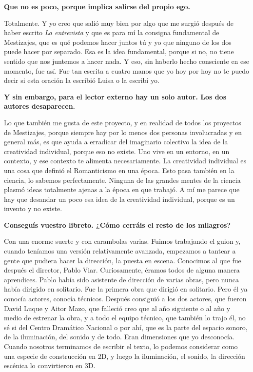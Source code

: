 \documentclass[11pt,a4paper]{article}
\newcommand{\preg}[1]{\textbf{#1}}
\begin{document}
\preg{Que no es poco, porque implica salirse del propio ego.}

Totalmente. Y yo creo que salió muy bien por algo que me surgió después de haber escrito \emph{La entrevista} y que es para mí la consigna fundamental de Mestizajes, que es qué podemos hacer juntos tú y yo que ninguno de los dos puede hacer por separado. Esa es la idea fundamental, porque si no, no tiene sentido que nos juntemos a hacer nada. Y eso, sin haberlo hecho consciente en ese momento, fue así. Fue tan escrita a cuatro manos que yo hoy por hoy no te puedo decir si esta oración la escribió Luisa o la escribí yo.

\preg{Y sin embargo, para el lector externo hay un solo autor. Los dos autores desaparecen.}

Lo que también me gusta de este proyecto, y en realidad de todos los proyectos de Mestizajes, porque siempre hay por lo menos dos personas involucradas y en general más, es que ayuda a erradicar del imaginario colectivo la idea de la creatividad individual, porque eso no existe. Uno vive en un entorno, en un contexto, y ese contexto te alimenta necesariamente. La creatividad individual es una cosa que definió el Romanticismo en una época. Esto pasa también en la ciencia, lo sabemos perfectamente. Ninguna de las grandes mentes de la ciencia plasmó ideas totalmente ajenas a la época en que trabajó. A mí me parece que hay que desandar un poco esa idea de la creatividad individual, porque es un invento y no existe.

\preg{Conseguís vuestro libreto. ¿Cómo cerráis el resto de los milagros?}

Con una enorme suerte y con carambolas varias. Fuimos trabajando el guion y, cuando teníamos una versión relativamente avanzada, empezamos a tantear a gente que pudiera hacer la dirección, la puesta en escena. Conocimos al que fue después el director, Pablo Viar. Curiosamente, éramos todos de alguna manera aprendices. Pablo había sido asistente de dirección de varias obras, pero nunca había dirigido en solitario. Fue la primera obra que dirigió en solitario. Pero él ya conocía actores, conocía técnicos. Después consiguió a los dos actores, que fueron David Luque y Aitor Mazo, que falleció creo que al año siguiente o al año y medio de estrenar la obra, y a todo el equipo técnico, que también lo trajo él, no sé si del Centro Dramático Nacional o por ahí, que es la parte del espacio sonoro, de la iluminación, del sonido y de todo. Eran dimensiones que yo desconocía. Cuando nosotros terminamos de escribir el texto, lo podemos considerar como una especie de construcción en 2D, y luego la iluminación, el sonido, la dirección escénica lo convirtieron en 3D.
\end{document}
